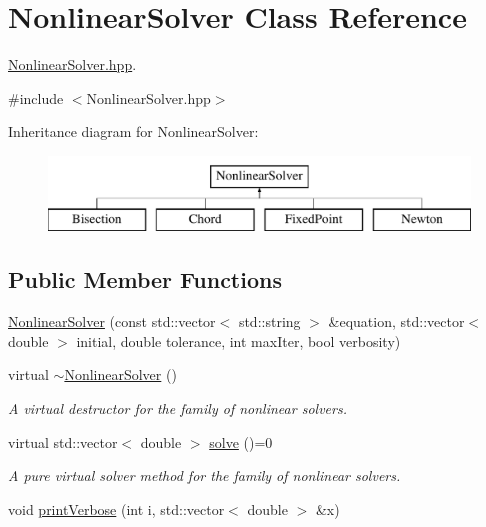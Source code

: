 \hypertarget{class_nonlinear_solver}{}\section{Nonlinear\+Solver Class Reference}
\label{class_nonlinear_solver}


\hyperlink{_nonlinear_solver_8hpp_source}{Nonlinear\+Solver.\+hpp}.  




{\ttfamily \#include $<$Nonlinear\+Solver.\+hpp$>$}

Inheritance diagram for Nonlinear\+Solver\+:\begin{figure}[H]
\begin{center}
\leavevmode
\includegraphics[height=2.000000cm]{class_nonlinear_solver}
\end{center}
\end{figure}
\subsection*{Public Member Functions}
\begin{DoxyCompactItemize}
\item 
\hyperlink{class_nonlinear_solver_a92d6163471127bbada316c89e1d2a887}{Nonlinear\+Solver} (const std\+::vector$<$ std\+::string $>$ \&equation, std\+::vector$<$ double $>$ initial, double tolerance, int max\+Iter, bool verbosity)
\item 
virtual \hyperlink{class_nonlinear_solver_ad29eabca357434c5e40764a80ee8482f}{$\sim$\+Nonlinear\+Solver} ()\hypertarget{class_nonlinear_solver_ad29eabca357434c5e40764a80ee8482f}{}\label{class_nonlinear_solver_ad29eabca357434c5e40764a80ee8482f}

\begin{DoxyCompactList}\small\item\em A virtual destructor for the family of nonlinear solvers. \end{DoxyCompactList}\item 
virtual std\+::vector$<$ double $>$ \hyperlink{class_nonlinear_solver_a93fe2135eed6993bb2707865c191f90a}{solve} ()=0\hypertarget{class_nonlinear_solver_a93fe2135eed6993bb2707865c191f90a}{}\label{class_nonlinear_solver_a93fe2135eed6993bb2707865c191f90a}

\begin{DoxyCompactList}\small\item\em A pure virtual solver method for the family of nonlinear solvers. \end{DoxyCompactList}\item 
void \hyperlink{class_nonlinear_solver_a48afde9fa4ded898744d57691920d514}{print\+Verbose} (int i, std\+::vector$<$ double $>$ \&x)
\end{DoxyCompactItemize}
